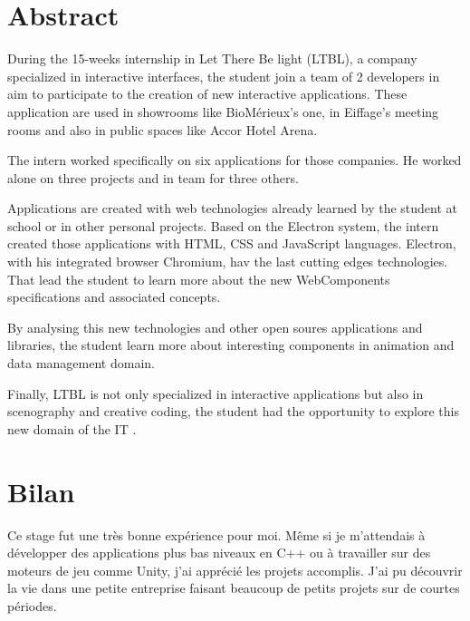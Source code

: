 \documentclass{article}
\begin{document}
    \section{Abstract}

    During the 15-weeks internship in Let There Be light (LTBL), a company specialized in interactive interfaces, the student join a team of 2 developers in aim to participate to the creation of new interactive applications.
    These application are used in showrooms like BioMérieux's one, in Eiffage's meeting rooms and also in public spaces like Accor Hotel Arena.

    The intern worked specifically on six applications for those companies.
    He worked alone on three projects and in team for three others.

    Applications are created with web technologies already learned by the student at school or in other personal projects.
    Based on the Electron system, the intern created those applications with HTML, CSS and JavaScript languages.
    Electron, with his integrated browser Chromium, hav the last cutting edges technologies.
    That lead the student to learn more about the new WebComponents specifications and associated concepts.

    By analysing this new technologies and other open soures applications and libraries, the student learn more about interesting components in animation and data management domain.

    Finally, LTBL is not only specialized in interactive applications but also in scenography and creative coding,
    the student had the opportunity to explore this new domain of the IT .

    

    

    

    

    

    

    

    \section{Bilan}

    Ce stage fut une très bonne expérience pour moi.
    Même si je m'attendais à développer des applications plus bas niveaux en C++ ou à travailler sur des moteurs de jeu comme Unity, j'ai apprécié les projets accomplis.
    J'ai pu découvrir la vie dans une petite entreprise faisant beaucoup de petits projets sur de courtes périodes.
\end{document}
